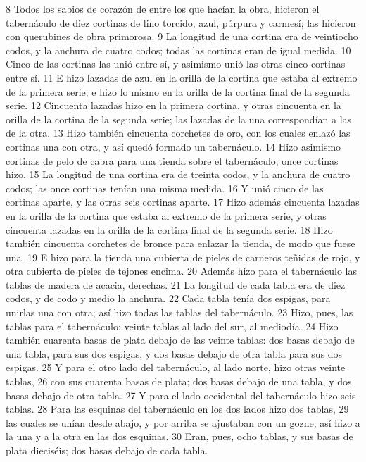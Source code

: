 8 Todos los sabios de corazón de entre los que hacían la obra, hicieron el tabernáculo de diez cortinas de lino torcido, azul, púrpura y carmesí; las hicieron con querubines de obra primorosa.
9 La longitud de una cortina era de veintiocho codos, y la anchura de cuatro codos; todas las cortinas eran de igual medida.
10 Cinco de las cortinas las unió entre sí, y asimismo unió las otras cinco cortinas entre sí.
11 E hizo lazadas de azul en la orilla de la cortina que estaba al extremo de la primera serie; e hizo lo mismo en la orilla de la cortina final de la segunda serie.
12 Cincuenta lazadas hizo en la primera cortina, y otras cincuenta en la orilla de la cortina de la segunda serie; las lazadas de la una correspondían a las de la otra.
13 Hizo también cincuenta corchetes de oro, con los cuales enlazó las cortinas una con otra, y así quedó formado un tabernáculo.
14 Hizo asimismo cortinas de pelo de cabra para una tienda sobre el tabernáculo; once cortinas hizo.
15 La longitud de una cortina era de treinta codos, y la anchura de cuatro codos; las once cortinas tenían una misma medida.
16 Y unió cinco de las cortinas aparte, y las otras seis cortinas aparte.
17 Hizo además cincuenta lazadas en la orilla de la cortina que estaba al extremo de la primera serie, y otras cincuenta lazadas en la orilla de la cortina final de la segunda serie.
18 Hizo también cincuenta corchetes de bronce para enlazar la tienda, de modo que fuese una.
19 E hizo para la tienda una cubierta de pieles de carneros teñidas de rojo, y otra cubierta de pieles de tejones encima.
20 Además hizo para el tabernáculo las tablas de madera de acacia, derechas.
21 La longitud de cada tabla era de diez codos, y de codo y medio la anchura.
22 Cada tabla tenía dos espigas, para unirlas una con otra; así hizo todas las tablas del tabernáculo.
23 Hizo, pues, las tablas para el tabernáculo; veinte tablas al lado del sur, al mediodía.
24 Hizo también cuarenta basas de plata debajo de las veinte tablas: dos basas debajo de una tabla, para sus dos espigas, y dos basas debajo de otra tabla para sus dos espigas.
25 Y para el otro lado del tabernáculo, al lado norte, hizo otras veinte tablas,
26 con sus cuarenta basas de plata; dos basas debajo de una tabla, y dos basas debajo de otra tabla.
27 Y para el lado occidental del tabernáculo hizo seis tablas.
28 Para las esquinas del tabernáculo en los dos lados hizo dos tablas,
29 las cuales se unían desde abajo, y por arriba se ajustaban con un gozne; así hizo a la una y a la otra en las dos esquinas.
30 Eran, pues, ocho tablas, y sus basas de plata dieciséis; dos basas debajo de cada tabla.

